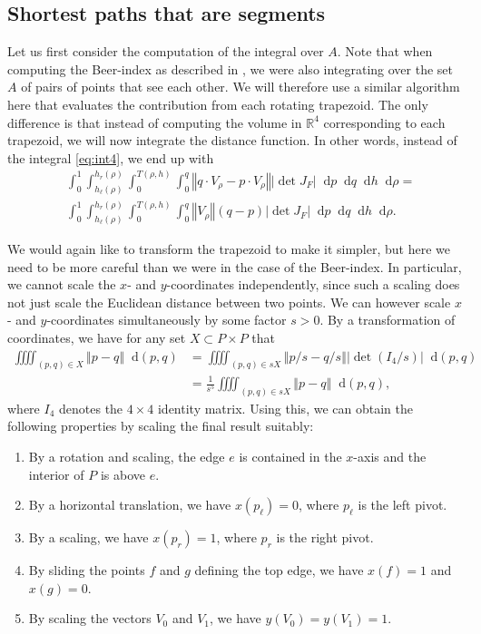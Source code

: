 \documentclass{article}
\newcommand*\diff{\mathop{}\!\mathrm{d}}
\begin{document}
\subsection{Shortest paths that are segments}
Let us first consider the computation of the integral over $A$.
Note that when computing the Beer-index as described in , we were also integrating over the set $A$ of pairs of points that see each other.
We will therefore use a similar algorithm here that evaluates the contribution from each rotating trapezoid.
The only difference is that instead of computing the volume in $\mathbb R^4$ corresponding to each trapezoid, we will now integrate the distance function.
In other words, instead of the integral \eqref{eq:int4}, we end up with
\begin{align}
& \int_0^1
\int_{h_\ell(\rho)}^{h_r(\rho)}
\int_0^{T(\rho,h)}
\int_0^{q}
\left\Vert q\cdot V_\rho - p\cdot V_\rho\right\Vert
\left\vert \det J_F\right\vert \diff p \diff q \diff h \diff\rho = \nonumber\\
& \int_0^1
\int_{h_\ell(\rho)}^{h_r(\rho)}
\int_0^{T(\rho,h)}
\int_0^{q}
\left\Vert V_\rho\right\Vert
\left( q-p\right)
\left\vert \det J_F\right\vert \diff p \diff q \diff h \diff\rho. \label{eq:intWienerTrapez}
\end{align}

We would again like to transform the trapezoid to make it simpler, but here we need to be more careful than we were in the case of the Beer-index.
In particular, we cannot scale the $x$- and $y$-coordinates independently, since such a scaling does not just scale the Euclidean distance between two points.
We can however scale $x$- and $y$-coordinates simultaneously by some factor $s>0$.
By a transformation of coordinates, we have for any set $X\subset P\times P$ that
\begin{align*}
\iiiint_{(p,q)\in X} \left\Vert p - q\right\Vert \diff (p,q) & =
\iiiint_{(p,q)\in sX} \left\Vert p/s - q/s\right\Vert \left\vert\det (I_4/s)\right\vert\diff (p,q) \\
& =
\frac 1{s^5} \iiiint_{(p,q)\in sX} \left\Vert p - q\right\Vert \diff (p,q),
\end{align*}
where $I_4$ denotes the $4\times 4$ identity matrix.
Using this, we can obtain the following properties by scaling the final result suitably:
\begin{enumerate}
\item By a rotation and scaling, the edge $e$ is contained in the $x$-axis and the interior of $P$ is above $e$.
\item By a horizontal translation, we have $x(p_\ell)=0$, where $p_\ell$ is the left pivot.
\item By a scaling, we have $x(p_r)=1$, where $p_r$ is the right pivot.\label{item:wiener3}
\item By sliding the points $f$ and $g$ defining the top edge, we have $x(f)=1$ and $x(g)=0$.\label{item:wiener4}
\item By scaling the vectors $V_0$ and $V_1$, we have $y(V_0)=y(V_1)=1$.\label{item:wiener5}
\end{enumerate}
\end{document}
